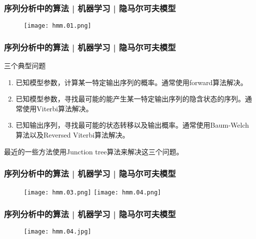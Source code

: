 \begin{frame}
  \frametitle{序列分析中的算法 | 机器学习 | 隐马尔可夫模型}
  \begin{figure}
    \centering
    \texttt{[image: hmm.01.png]}
  \end{figure}
\end{frame}

\begin{frame}
  \frametitle{序列分析中的算法 | 机器学习 | 隐马尔可夫模型}
  \begin{block}{三个典型问题}
    \begin{enumerate}
      \item 已知模型参数，计算某一特定输出序列的概率。通常使用forward算法解决。
      \item 已知模型参数，寻找最可能的能产生某一特定输出序列的隐含状态的序列。通常使用Viterbi算法解决。
      \item 已知输出序列，寻找最可能的状态转移以及输出概率。通常使用Baum-Welch算法以及Reversed Viterbi算法解决。
    \end{enumerate}
  \end{block}
最近的一些方法使用Junction tree算法来解决这三个问题。
\end{frame}

\begin{frame}
  \frametitle{序列分析中的算法 | 机器学习 | 隐马尔可夫模型}
  \begin{figure}
    \centering
    \texttt{[image: hmm.03.png]}
    \texttt{[image: hmm.04.png]}
  \end{figure}
\end{frame}

\begin{frame}
  \frametitle{序列分析中的算法 | 机器学习 | 隐马尔可夫模型}
  \begin{figure}
    \centering
    \texttt{[image: hmm.04.jpg]}
  \end{figure}
\end{frame}

